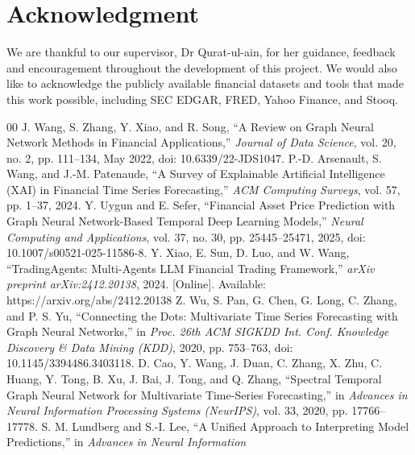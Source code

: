 \documentclass[conference]{IEEEtran}
\begin{document}
\section*{Acknowledgment}
We are thankful to our supervisor, Dr Qurat-ul-ain, for her guidance, feedback and encouragement throughout the development of this project. We would also like to acknowledge the publicly available financial datasets and tools that made this work possible, including SEC EDGAR, FRED, Yahoo Finance, and Stooq. 



\begin{thebibliography}{00}
    J. Wang, S. Zhang, Y. Xiao, and R. Song, ``A Review on Graph Neural
    Network Methods in Financial Applications,''
    \textit{Journal of Data Science}, vol. 20, no. 2, pp. 111--134,
    May 2022, doi: 10.6339/22-JDS1047.
    P.-D. Arsenault, S. Wang, and J.-M. Patenaude, ``A Survey of Explainable
    Artificial Intelligence (XAI) in Financial Time Series Forecasting,''
    \textit{ACM Computing Surveys}, vol. 57, pp. 1--37, 2024.
    Y. Uygun and E. Sefer, ``Financial Asset Price Prediction with Graph
    Neural Network-Based Temporal Deep Learning Models,''
    \textit{Neural Computing and Applications}, vol. 37, no. 30,
    pp. 25445--25471, 2025, doi: 10.1007/s00521-025-11586-8.
    Y. Xiao, E. Sun, D. Luo, and W. Wang, ``TradingAgents: Multi-Agents LLM
    Financial Trading Framework,'' \textit{arXiv preprint arXiv:2412.20138},
    2024. [Online]. Available: https://arxiv.org/abs/2412.20138
    Z. Wu, S. Pan, G. Chen, G. Long, C. Zhang, and P. S. Yu, ``Connecting the
    Dots: Multivariate Time Series Forecasting with Graph Neural Networks,''
    in \textit{Proc. 26th ACM SIGKDD Int. Conf. Knowledge Discovery \&
    Data Mining (KDD)}, 2020, pp. 753--763,
    doi: 10.1145/3394486.3403118.
    D. Cao, Y. Wang, J. Duan, C. Zhang, X. Zhu, C. Huang, Y. Tong,
    B. Xu, J. Bai, J. Tong, and Q. Zhang, ``Spectral Temporal Graph Neural
    Network for Multivariate Time-Series Forecasting,'' in
    \textit{Advances in Neural Information Processing Systems (NeurIPS)},
    vol. 33, 2020, pp. 17766--17778.
    S. M. Lundberg and S.-I. Lee, ``A Unified Approach to Interpreting
    Model Predictions,'' in \textit{Advances in Neural Information
}
\end{thebibliography}
\end{document}

